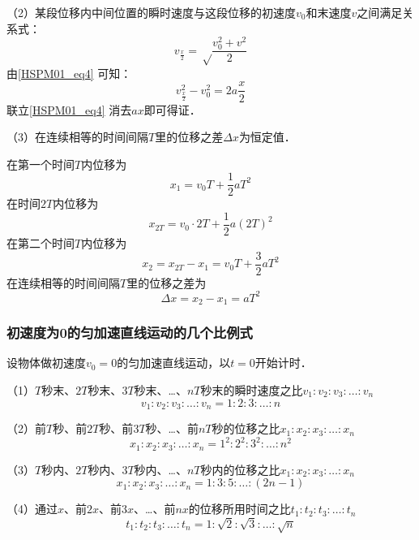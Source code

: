 （2）某段位移内中间位置的瞬时速度与这段位移的初速度$v_0$和末速度$v$之间满足关系式：
\begin{equation}
v_\frac x2=\sqrt \frac{v_0^2+v^2}2
\end{equation}
由\autoref{HSPM01_eq4} 可知：
\begin{equation}
v_{\frac x2}^2-v_0^2=2a\frac x2
\end{equation}
联立\autoref{HSPM01_eq4} 消去$ax$即可得证．

（3）在连续相等的时间间隔$T$里的位移之差$\Delta x$为恒定值．

在第一个时间$T$内位移为
\begin{equation}
x_1=v_0T+\frac12aT^2
\end{equation}
在时间$2T$内位移为
\begin{equation}
x_{2T}=v_0\cdot2T+\frac12a(2T)^2
\end{equation}
在第二个时间$T$内位移为
\begin{equation}
x_2=x_{2T}-x_1=v_0T+\frac32aT^2
\end{equation}
在连续相等的时间间隔$T$里的位移之差为
\begin{equation}
\Delta x=x_2-x_1=aT^2
\end{equation}

\subsubsection{初速度为0的匀加速直线运动的几个比例式}
设物体做初速度$v_0=0$的匀加速直线运动，以$t=0$开始计时．

（1）$T$秒末、$2T$秒末、$3T$秒末、…、$nT$秒末的瞬时速度之比$v_1:v_2:v_3:\dots:v_n$
\begin{equation}
v_1:v_2:v_3:\dots:v_n=1:2:3:\dots:n
\end{equation}

（2）前$T$秒、前$2T$秒、前$3T$秒、…、前$nT$秒的位移之比$x_1:x_2:x_3:\dots:x_n$
\begin{equation}
x_1:x_2:x_3:\dots:x_n=1^2:2^2:3^2:\dots:n^2
\end{equation}

（3）$T$秒内、$2T$秒内、$3T$秒内、…、$nT$秒内的位移之比$x_1:x_2:x_3:\dots:x_n$
\begin{equation}
x_1:x_2:x_3:\dots:x_n=1:3:5:\dots:(2n-1)
\end{equation}

（4）通过$x$、前$2x$、前$3x$、…、前$nx$的位移所用时间之比$t_1:t_2:t_3:\dots:t_n$
\begin{equation}
t_1:t_2:t_3:\dots:t_n=1:\sqrt{2}:\sqrt{3}:\dots:\sqrt{n}
\end{equation}

